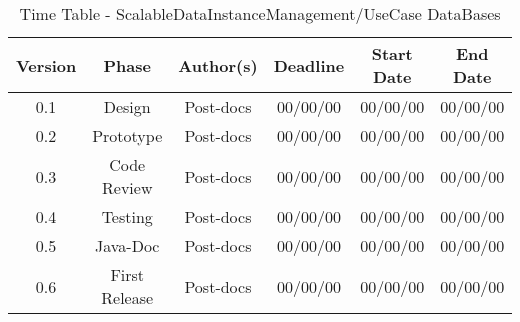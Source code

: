 \begin{table}
\caption{Time Table - ScalableDataInstanceManagement/UseCase DataBases}
\begin{tabular}{cccccc}
\hline
\textbf{Version} & \textbf{Phase} & \textbf{Author(s)} & \textbf{Deadline} & \textbf{Start Date} & \textbf{End Date}\\
\hline
0.1 & Design & Post-docs & 00/00/00 & 00/00/00 & 00/00/00\\
\hline 
0.2 & Prototype & Post-docs & 00/00/00 & 00/00/00 & 00/00/00\\
\hline 
0.3 & Code Review & Post-docs & 00/00/00 & 00/00/00 & 00/00/00\\
\hline 
0.4 & Testing & Post-docs & 00/00/00 & 00/00/00 & 00/00/00\\
\hline 
0.5 & Java-Doc  & Post-docs & 00/00/00 & 00/00/00 & 00/00/00\\
\hline 
0.6 & First Release & Post-docs & 00/00/00 & 00/00/00 & 00/00/00\\
\hline
\end{tabular}
\end{table}